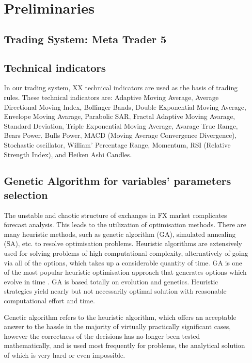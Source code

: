 \section{Preliminaries}

\subsection{Trading System: Meta Trader 5}

\subsection{Technical indicators}
In our trading system, XX technical indicators are used as the basis of trading rules. These technical indicators are: Adaptive Moving Average, Average Directional Moving Index, Bollinger Bands, Double Exponential Moving Average, Envelope Moving Avarage, Parabolic SAR, Fractal Adaptive Moving Avarage, Standard Deviation, Triple Exponential Moving Average, Avarage True Range, Bears Power, Bulls Power, MACD (Moving Average Convergence Divergence), Stochastic oscillator, William' Percentage Range, Momentum, RSI (Relative Strength Index), and Heiken Ashi Candles.

\subsection{Genetic Algorithm for variables' parameters selection}
The unstable and chaotic structure of exchanges in FX market complicates forecast analysis. This leads to the utilization of optimisation methods. There are many heuristic methods, such as genetic algorithm (GA), simulated annealing (SA), etc. to resolve optimisation problems. Heuristic algorithms are extensively used for solving problems of high computational complexity, alternatively of going via all of the options, which takes up a considerable quantity of time. GA is one of the most popular heuristic optimisation approach that generates options which evolve in time \cite{OZTURK2016170}. GA is based totally on evolution and genetics. Heuristic strategies yield nearly but not necessarily optimal solution with reasonable computational effort and time.

Genetic algorithm refers to the heuristic algorithm, which offers an acceptable answer to the hassle in the majority of virtually practically significant cases, however the correctness of the decisions has no longer been tested mathematically, and is used most frequently for problems, the analytical solution of which is very hard or even impossible.

